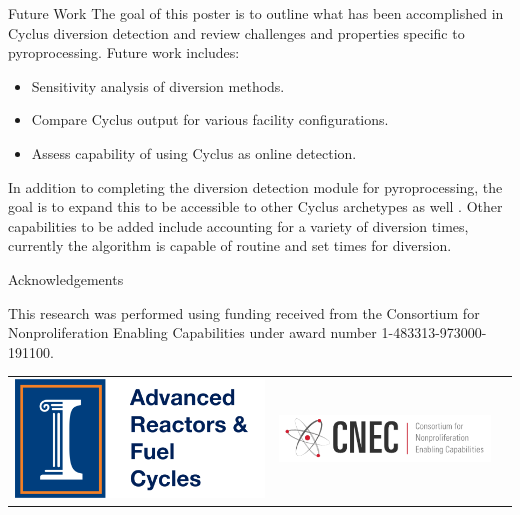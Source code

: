 \documentclass[final]{beamer}
\newlength{\onecolwid}
\newlength{\threecolwid}
\begin{document}
\begin{frame}[t]
\begin{columns}[t,totalwidth=\threecolwid]
\begin{column}{\onecolwid}
\begin{alertblock}{Future Work}
	The goal of this poster is to outline what has been accomplished in Cyclus diversion detection and review challenges and properties
	specific to pyroprocessing. Future work includes:
	\begin{itemize}
		\item Sensitivity analysis of diversion methods.
		\item Compare Cyclus output for various facility configurations.
		\item Assess capability of using Cyclus as online detection.
	\end{itemize} 
	\vspace{10mm}
	In addition to completing the diversion detection module for pyroprocessing, the goal is to expand this to be accessible to
	other Cyclus archetypes as well \cite{Huff_2016}. Other capabilities to be added include accounting for a variety of diversion times,
	currently the algorithm is capable of routine and set times for diversion.
\end{alertblock}



\begin{block}{Acknowledgements}
	
	This research was performed using funding received
	from the Consortium for Nonproliferation Enabling
	Capabilities under award number 1-483313-973000-191100.
	
	\vspace{10mm}
	\begin{center}
		\begin{tabular}{ccc}
			\includegraphics[width=0.3\linewidth]{logo.png} & \includegraphics[width=0.5\linewidth]{cnec_logo}
		\end{tabular}
	\end{center}
	

\end{block}
\end{column}
\end{columns}
\end{frame}
\end{document}
